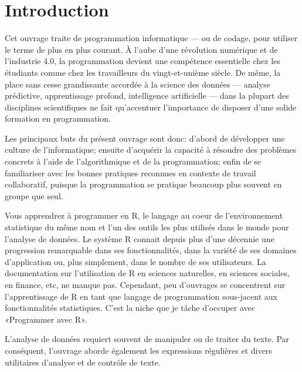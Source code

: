 
\chapter{Introduction}

Cet ouvrage traite de programmation informatique --- ou de codage,
pour utiliser le terme de plus en plus courant. À l'aube d'une
révolution numérique et de l'industrie 4.0, la programmation devient
une compétence essentielle chez les étudiants comme chez les
travailleurs du vingt-et-unième siècle. De même, la place sans cesse
grandissante accordée à la science des données --- analyse prédictive,
apprentissage profond, intelligence artificielle --- dans la plupart
des disciplines scientifiques ne fait qu'accentuer l'importance de
disposer d'une solide formation en programmation.

Les principaux buts du présent ouvrage sont donc: d'abord de
développer une culture de l'informatique; ensuite d'acquérir la
capacité à résoudre des problèmes concrets à l'aide de l'algorithmique
et de la programmation; enfin de se familiariser avec les bonnes
pratiques reconnues en contexte de travail collaboratif, puisque la
programmation se pratique beaucoup plus souvent en groupe que seul.

Vous apprendrez à programmer en R, le langage au coeur de
l'environnement statistique du même nom et l'un des outils les plus
utilisés dans le monde pour l'analyse de données. Le système R connait
depuis plus d'une décennie une progression remarquable dans ses
fonctionnalités, dans la variété de ses domaines d'application ou,
plus simplement, dans le nombre de ses utilisateurs. La documentation
sur l'utilisation de R en sciences naturelles, en sciences sociales,
en finance, etc, ne manque pas. Cependant, peu d'ouvrages se
concentrent sur l'apprentissage de R en tant que langage de
programmation sous-jacent aux fonctionnalités statistiques. C'est la
niche que je tâche d'occuper avec «Programmer avec R».

L'analyse de données requiert souvent de manipuler ou de traiter du
texte. Par conséquent, l'ouvrage aborde également les expressions
régulières et divers utilitaires d'analyse et de contrôle de texte.

